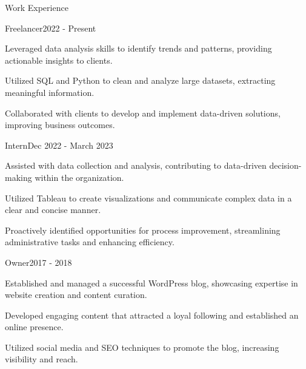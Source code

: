 \documentclass{resume} %
\begin{document}
    \begin{rSection}{Work Experience}
                    \begin{rSubsection}
                {Freelancer}{2022 - Present}
                                    {}
                                {\normalfont{\textit{}}}
                                    \item Leveraged data analysis skills to identify trends and patterns, providing actionable insights to clients.
                                    \item Utilized SQL and Python to clean and analyze large datasets, extracting meaningful information.
                                    \item Collaborated with clients to develop and implement data{-}driven solutions, improving business outcomes.
                            \end{rSubsection}
                    \begin{rSubsection}
                {Intern}{Dec 2022 - March 2023}
                                    {}
                                {\normalfont{\textit{}}}
                                    \item Assisted with data collection and analysis, contributing to data{-}driven decision{-}making within the organization.
                                    \item Utilized Tableau to create visualizations and communicate complex data in a clear and concise manner.
                                    \item Proactively identified opportunities for process improvement, streamlining administrative tasks and enhancing efficiency.
                            \end{rSubsection}
                    \begin{rSubsection}
                {Owner}{2017 - 2018}
                                    {}
                                {\normalfont{\textit{}}}
                                    \item Established and managed a successful WordPress blog, showcasing expertise in website creation and content curation.
                                    \item Developed engaging content that attracted a loyal following and established an online presence.
                                    \item Utilized social media and SEO techniques to promote the blog, increasing visibility and reach.
                            \end{rSubsection}
            \end{rSection}
\end{document}
